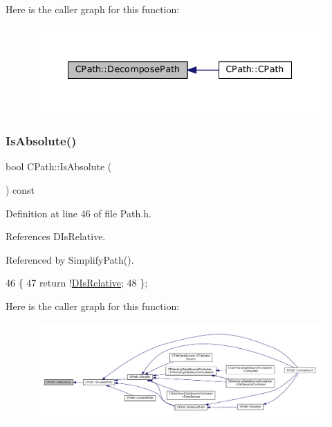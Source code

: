 Here is the caller graph for this function\+:\nopagebreak
\begin{figure}[H]
\begin{center}
\leavevmode
\includegraphics[width=335pt]{classCPath_aae05f3c3502e92bf68d5ce71264c7bb9_icgraph}
\end{center}
\end{figure}
\hypertarget{classCPath_a613d8d4c4b72dba9fc8b6e487f583d7d}{}\label{classCPath_a613d8d4c4b72dba9fc8b6e487f583d7d} 
\subsubsection{\texorpdfstring{Is\+Absolute()}{IsAbsolute()}}
{\footnotesize\ttfamily bool C\+Path\+::\+Is\+Absolute (\begin{DoxyParamCaption}{ }\end{DoxyParamCaption}) const\hspace{0.3cm}{\ttfamily [inline]}}



Definition at line 46 of file Path.\+h.



References D\+Is\+Relative.



Referenced by Simplify\+Path().


\begin{DoxyCode}
46                                \{
47             \textcolor{keywordflow}{return} !\hyperlink{classCPath_af705ff149bb2281c67afb84fff550eb9}{DIsRelative};  
48         \};
\end{DoxyCode}
Here is the caller graph for this function\+:\nopagebreak
\begin{figure}[H]
\begin{center}
\leavevmode
\includegraphics[width=350pt]{classCPath_a613d8d4c4b72dba9fc8b6e487f583d7d_icgraph}
\end{center}
\end{figure}
\hypertarget{classCPath_a59cf4c412366aef121fcbc97339ad13b}{}\label{classCPath_a59cf4c412366aef121fcbc97339ad13b} 
